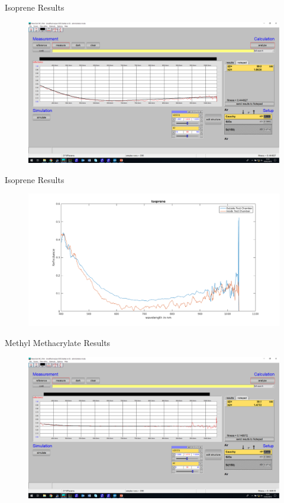 \documentclass[10pt]{beamer}
\begin{document}
\begin{frame}{Isoprene Results}
\begin{figure}
\centering
\includegraphics[width=\textwidth]{i2.png}
\end{figure}
\end{frame}

\begin{frame}{Isoprene Results}
\begin{figure}
\centering
\includegraphics[width=\textwidth]{i3.png}
\end{figure}
\end{frame}

\begin{frame}{Methyl Methacrylate Results}
\begin{figure}
\centering
\includegraphics[width=\textwidth]{m1.png}
\end{figure}
\end{frame}
\end{document}
